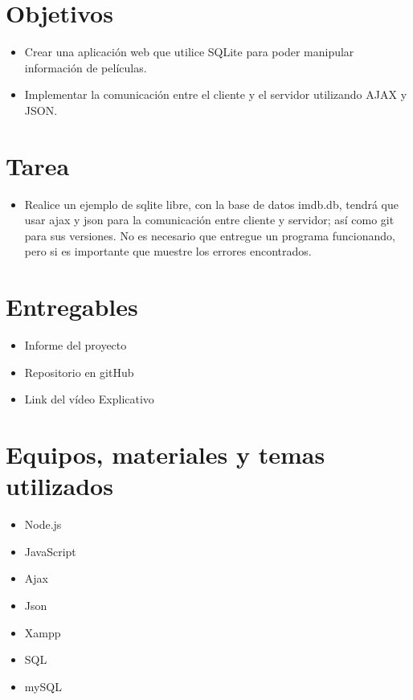 \documentclass{article}
\begin{document}

  \section{Objetivos}
  \begin{itemize}
    \item Crear una aplicación web que utilice SQLite para poder manipular información de películas.
    \item Implementar la comunicación entre el cliente y el servidor utilizando AJAX y JSON.
  \end{itemize}

 
	\section{Tarea}
  \begin{itemize}
    \item Realice un ejemplo de sqlite libre, con la base de datos imdb.db, tendrá que usar ajax y json 
      para la comunicación entre cliente y servidor; así como git para sus versiones. No es necesario que 
      entregue un programa funcionando, pero si es importante que muestre los errores encontrados.
  \end{itemize}
  
 
  \section{Entregables}
  \begin{itemize}
    \item Informe del proyecto
    \item Repositorio en gitHub
    \item Link del vídeo Explicativo
  \end{itemize}
  
		
	\section{Equipos, materiales y temas utilizados}
  \begin{itemize}
    \item Node.js
    \item JavaScript
    \item Ajax
    \item Json
    \item Xampp
    \item SQL
    \item mySQL
  \end{itemize}
 
\end{document}
